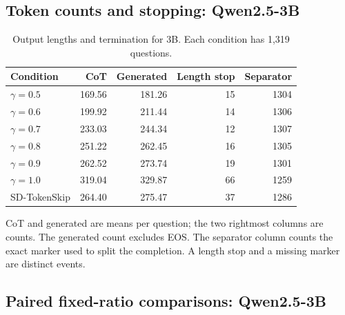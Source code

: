 
\subsection{Token counts and stopping: Qwen2.5-3B}

\begin{table}[H]\centering\small

\caption{Output lengths and termination for 3B. Each condition has 1,319 questions.}

\begin{tabular}{lrrrr}

\toprule

Condition & CoT & Generated & Length stop & Separator\\

\midrule

$\gamma=0.5$ & 169.56 & 181.26 & 15 & 1304\\

$\gamma=0.6$ & 199.92 & 211.44 & 14 & 1306\\

$\gamma=0.7$ & 233.03 & 244.34 & 12 & 1307\\

$\gamma=0.8$ & 251.22 & 262.45 & 16 & 1305\\

$\gamma=0.9$ & 262.52 & 273.74 & 19 & 1301\\

$\gamma=1.0$ & 319.04 & 329.87 & 66 & 1259\\

SD-TokenSkip & 264.40 & 275.47 & 37 & 1286\\

\bottomrule\end{tabular}\end{table}

CoT and generated are means per question; the two rightmost columns are counts. The generated count excludes EOS. The separator column counts the exact marker used to split the completion. A length stop and a missing marker are distinct events.

\subsection{Paired fixed-ratio comparisons: Qwen2.5-3B}

